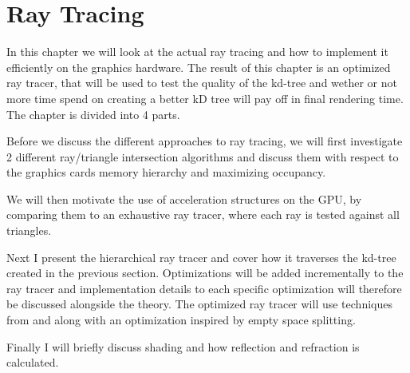 


\chapter{Ray Tracing}\label{chp:rayTracing}




In this chapter we will look at the actual ray tracing and how to
implement it efficiently on the graphics hardware. The result of this
chapter is an optimized ray tracer, that will be used to test the
quality of the kd-tree and wether or not more time spend on creating a
better kD tree will pay off in final rendering time. The chapter is
divided into 4 parts.

Before we discuss the different approaches to ray tracing, we will
first investigate 2 different ray/triangle intersection algorithms and
discuss them with respect to the graphics cards memory hierarchy and
maximizing occupancy.

We will then motivate the use of acceleration structures on the GPU,
by comparing them to an exhaustive ray tracer, where each ray is
tested against all triangles.

Next I present the hierarchical ray tracer and cover how it traverses
the kd-tree created in the previous section. Optimizations will be
added incrementally to the ray tracer and implementation details to
each specific optimization will therefore be discussed alongside the
theory. The optimized ray tracer will use techniques from
 and  along with an optimization
inspired by empty space splitting.

Finally I will briefly discuss shading and how reflection and
refraction is calculated.

